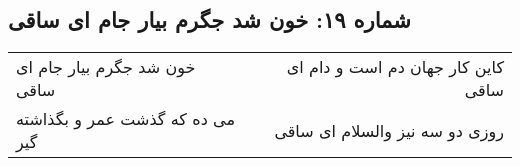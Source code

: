 \begin{center}
\section*{شماره ۱۹: خون شد جگرم بیار جام ای ساقی}
\label{sec:019}
\begin{longtable}{l p{0.5cm} r}
خون شد جگرم بیار جام ای ساقی
&&
کاین کار جهان دم است و دام ای ساقی
\\
می ده که گذشت عمر و بگذاشته گیر
&&
روزی دو سه نیز والسلام ای ساقی
\\
\end{longtable}
\end{center}
